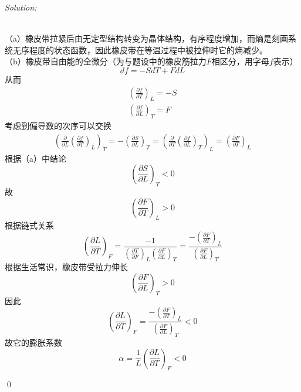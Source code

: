 \documentclass[12pt,a4paper]{article}
\newenvironment{sol}
    {\emph{Solution:}
    }
    {
    \qed
    }
\begin{document}
\begin{sol}
\\（a）橡皮带拉紧后由无定型结构转变为晶体结构，有序程度增加，而熵是刻画系统无序程度的状态函数，因此橡皮带在等温过程中被拉伸时它的熵减少。\\
（b）橡皮带自由能的全微分（为与题设中的橡皮筋拉力$F$相区分，用字母$f$表示）
\begin{equation}
df=-SdT+FdL
\end{equation}
从而
\begin{gather}
\left(\frac{\partial f}{\partial T}\right)_L=-S\\
\left(\frac{\partial f}{\partial L}\right)_T=F
\end{gather}
考虑到偏导数的次序可以交换
\begin{gather}
\left(\frac{\partial}{\partial L}\left(\frac{\partial f}{\partial T}\right)_L\right)_T=-\left(\frac{\partial S}{\partial L}\right)_T=\left(\frac{\partial}{\partial T}\left(\frac{\partial f}{\partial L}\right)_T\right)_L=\left(\frac{\partial F}{\partial T}\right)_L
\end{gather}
根据（a）中结论
\begin{equation}
\left(\frac{\partial S}{\partial L}\right)_T<0
\end{equation}
故
\begin{equation}
\left(\frac{\partial F}{\partial T}\right)_L>0
\end{equation}
根据链式关系
\begin{equation}
\left(\frac{\partial L}{\partial T}\right)_F=\frac{-1}{\left(\frac{\partial T}{\partial F}\right)_L\left(\frac{\partial F}{\partial L}\right)_T}=\frac{-\left(\frac{\partial F}{\partial T}\right)_L}{\left(\frac{\partial F}{\partial L}\right)_T}
\end{equation}
根据生活常识，橡皮带受拉力伸长
\begin{equation}
\left(\frac{\partial F}{\partial L}\right)_T>0
\end{equation}
因此
\begin{equation}
\left(\frac{\partial L}{\partial T}\right)_F=\frac{-\left(\frac{\partial F}{\partial T}\right)_L}{\left(\frac{\partial F}{\partial L}\right)_T}<0
\end{equation}
故它的膨胀系数
\begin{equation}
\alpha=\frac{1}{L}(\frac{\partial L}{\partial T})_F<0
\end{equation}
\end{sol}
\end{document}
